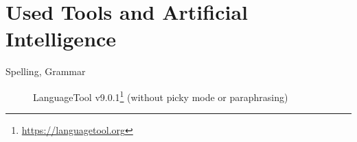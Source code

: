 \chapter{Used Tools and Artificial Intelligence}

\begin{description}
\item[Spelling, Grammar] LanguageTool v9.0.1\footnote{\url{https://languagetool.org}} (without picky mode or paraphrasing)
\end{description}
